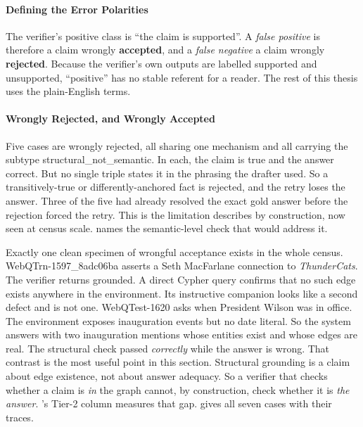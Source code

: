 \paragraph{Defining the Error Polarities}\label{sec:polarities}

The verifier's positive class is ``the claim is supported''. A \emph{false
positive} is therefore a claim wrongly \textbf{accepted}, and a \emph{false
negative} a claim wrongly \textbf{rejected}. Because the verifier's own outputs
are labelled \textsf{supported} and \textsf{unsupported}, ``positive'' has no
stable referent for a reader. The rest of this thesis uses the plain-English
terms.

\paragraph{Wrongly Rejected, and Wrongly Accepted}

Five cases are wrongly rejected, all sharing one mechanism and all carrying the
subtype \textsf{structural\_not\_semantic}. In each, the claim is true and the
answer correct. But no single triple states it in the phrasing the drafter used.
So a transitively-true or differently-anchored fact is rejected, and the retry
loses the answer. Three of the five had already resolved the exact gold answer
before the rejection forced the retry. This is the limitation
 describes by construction, now seen at census
scale.  names the semantic-level check that would address it.

Exactly one clean specimen of wrongful acceptance exists in the whole census.
\textsf{WebQTrn-1597\_8adc06ba} asserts a Seth MacFarlane connection to
\emph{ThunderCats}. The verifier returns \textsf{grounded}. A direct Cypher
query confirms that no such edge exists anywhere in the environment. Its
instructive companion looks like a second defect and is not one.
\textsf{WebQTest-1620} asks when President Wilson was in office. The environment
exposes inauguration events but no date literal. So the system answers with two
inauguration mentions whose entities exist and whose edges are real. The
structural check passed \emph{correctly} while the answer is wrong. That
contrast is the most useful point in this section. Structural grounding is a
claim about edge existence, not about answer adequacy. So a verifier that checks
whether a claim is \emph{in} the graph cannot, by construction, check whether it
is \emph{the answer}. 's Tier-2 column measures that gap.
 gives all seven cases with their traces.

